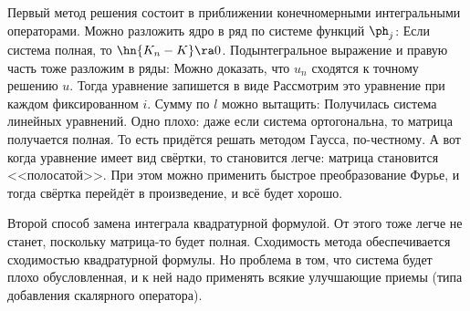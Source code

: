 \documentclass[a4paper]{article}
\begin{document}
Первый метод решения состоит в приближении конечномерными
интегральными операторами. Можно разложить ядро в ряд по системе
функций $\ph_j$: 
Если система полная, то $\hn{K_n-K}\ra 0$. Подынтегральное выражение и
правую часть тоже разложим в ряды:   
Можно доказать, что $u_n$ сходятся к точному решению $u$.  Тогда
уравнение запишется в виде
  Рассмотрим
это уравнение при каждом фиксированном $i$.  Сумму по $l$ можно
вытащить:
  Получилась система линейных уравнений. Одно плохо:
даже если система ортогональна, то матрица получается полная. То есть
придётся решать методом Гаусса, по-честному. А вот когда уравнение
имеет вид свёртки, то становится легче: матрица становится
<<полосатой>>.  При этом можно применить быстрое преобразование Фурье,
и тогда свёртка перейдёт в произведение, и всё будет хорошо.

Второй способ замена интеграла квадратурной формулой. От этого тоже
легче не станет, поскольку матрица-то будет полная.  Сходимость метода
обеспечивается сходимостью квадратурной формулы. Но проблема в том,
что система будет плохо обусловленная, и к ней надо применять всякие
улучшающие приемы (типа добавления скалярного оператора).
\end{document}
